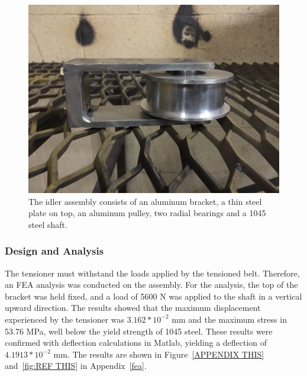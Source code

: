 \begin{figure}[htbp]
\centering
\includegraphics[height=0.3\textheight]{images/idler_assembly_bld}
\caption[Idler Assembly]{The idler assembly consists of an aluminum bracket, a thin steel plate on top, an aluminum pulley, two radial bearings and a 1045 steel shaft.}
\label{fig:idler}
\end{figure}

\subsubsection{Design and Analysis}

The tensioner must withstand the loads applied by the tensioned belt. Therefore, an FEA analysis was conducted on the assembly. For the analysis, the top of the bracket was held fixed, and a load of 5600 N was applied to the shaft in a vertical upward direction. The results showed that the maximum displacement experienced by the tensioner was ${3.162*10^{-2}}$ mm and the maximum stress in 53.76 MPa, well below the yield strength of 1045 steel. These results were confirmed with deflection calculations in Matlab, yielding a deflection of ${4.1913*10^{-2}}$ mm. The results are shown in Figure~\ref{APPENDIX THIS} and~\ref{fig:REF THIS} in Appendix~\ref{fea}.


